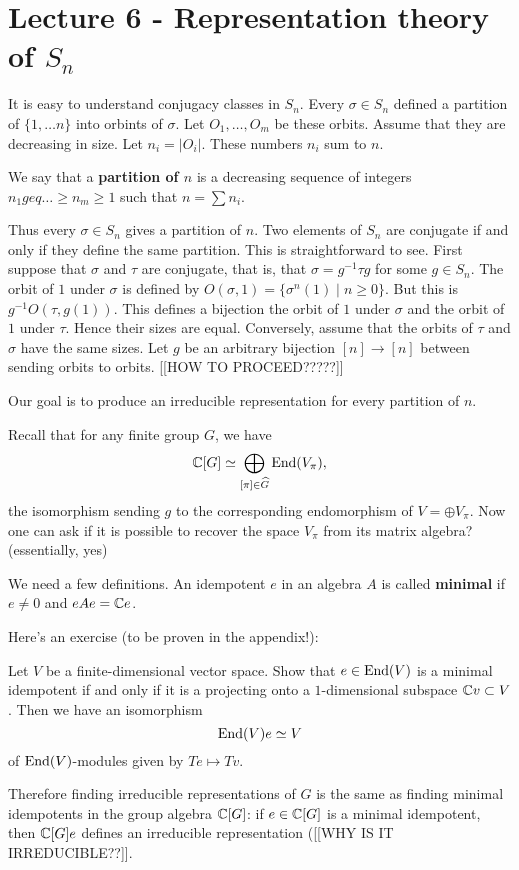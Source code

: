 \documentclass[11pt, english]{article}
\begin{document}
\newpage
\section{Lecture 6 - Representation theory of $S_n$}

It is easy to understand conjugacy classes in $S_n$. Every $\sigma \in S_n$ defined a partition of $\{ 1,\ldots n\}$ into orbints of $\sigma$. Let $O_1,\ldots,O_m$ be these orbits. Assume that they are decreasing in size. Let $n_i=\lvert O_i \rvert$. These numbers $n_i$ sum to $n$.

We say that a \textbf{partition of $n$} is a decreasing sequence of integers $n_1 geq \ldots \geq n_m \geq 1$ such that $n=\sum n_i$. 

Thus every $\sigma \in S_n$ gives a partition of $n$. Two elements of $S_n$ are conjugate if and only if they define the same partition. This is straightforward to see. First suppose that $\sigma$ and $\tau$ are conjugate, that is, that $\sigma = g^{-1} \tau g$ for some $g \in S_n$. The orbit of $1$ under $\sigma$ is defined by $O(\sigma,1) = \{ \sigma^n(1) \mid n \geq 0 \}$. But this is $g^{-1} O(\tau, g(1))$. This defines a bijection the orbit of $1$ under $\sigma$ and the orbit of $1$ under $\tau$. Hence their sizes are equal. Conversely, assume that the orbits of $\tau$ and $\sigma$ have the same sizes. Let $g$ be an arbitrary bijection $[n] \to [n]$ between sending orbits to orbits. [[HOW TO PROCEED?????]]

Our goal is to produce an irreducible representation for every partition of $n$.

Recall that for any finite group $G$, we have
$$
\mathbb{C} [G] \simeq \bigoplus_{[\pi] \in \widehat G} \operatorname{End}(V_\pi),
$$
the isomorphism sending $g$ to the corresponding endomorphism of $V = \oplus V_\pi$. Now one can ask if it is possible to recover the space $V_\pi$ from its matrix algebra? (essentially, yes)

We need a few definitions. An idempotent $e$ in an algebra $A$ is called \textbf{minimal} if $e \neq 0$ and $eAe =\mathbb{C} e$. 

Here's an exercise (to be proven in the appendix!):
\begin{exc}
 Let $V$ be a finite-dimensional vector space. Show that $e \in \operatorname{End}(V)$ is a minimal idempotent if and only if it is a projecting onto a $1$-dimensional subspace $\mathbb{C} v \subset V$. Then we have an isomorphism
$$
\operatorname{End}(V)e \simeq V
$$
of $\operatorname{End}(V)$-modules given by $Te \mapsto Tv$. 
\end{exc}
Therefore finding irreducible representations of $G$ is the same as finding minimal idempotents in the group algebra $\mathbb{C}[G]$: if $e \in \mathbb{C}[G]$ is a minimal idempotent, then $\mathbb{C}[G]e$ defines an irreducible representation ([[WHY IS IT IRREDUCIBLE??]].
\end{document}
